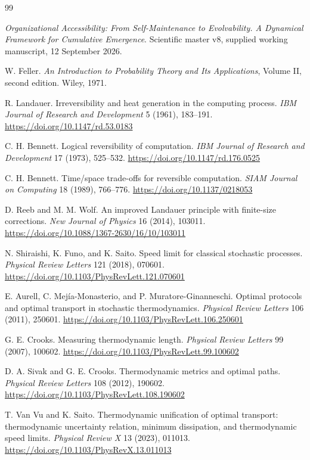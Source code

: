 \documentclass[11pt,a4paper]{article}
\theoremstyle{definition}
\numberwithin{equation}{section}
\begin{document}
\begin{thebibliography}{99}

\emph{Organizational Accessibility: From Self-Maintenance to
Evolvability. A Dynamical Framework for Cumulative Emergence}.
Scientific master v8, supplied working manuscript,
12 September 2026.

W. Feller.
\emph{An Introduction to Probability Theory and Its Applications},
Volume II, second edition.
Wiley, 1971.

R. Landauer.
Irreversibility and heat generation in the computing process.
\emph{IBM Journal of Research and Development}
5 (1961), 183--191.
\url{https://doi.org/10.1147/rd.53.0183}

C. H. Bennett.
Logical reversibility of computation.
\emph{IBM Journal of Research and Development}
17 (1973), 525--532.
\url{https://doi.org/10.1147/rd.176.0525}

C. H. Bennett.
Time/space trade-offs for reversible computation.
\emph{SIAM Journal on Computing}
18 (1989), 766--776.
\url{https://doi.org/10.1137/0218053}

D. Reeb and M. M. Wolf.
An improved Landauer principle with finite-size corrections.
\emph{New Journal of Physics}
16 (2014), 103011.
\url{https://doi.org/10.1088/1367-2630/16/10/103011}

N. Shiraishi, K. Funo, and K. Saito.
Speed limit for classical stochastic processes.
\emph{Physical Review Letters}
121 (2018), 070601.
\url{https://doi.org/10.1103/PhysRevLett.121.070601}

E. Aurell, C. Mej\'ia-Monasterio, and
P. Muratore-Ginanneschi.
Optimal protocols and optimal transport in stochastic thermodynamics.
\emph{Physical Review Letters}
106 (2011), 250601.
\url{https://doi.org/10.1103/PhysRevLett.106.250601}

G. E. Crooks.
Measuring thermodynamic length.
\emph{Physical Review Letters}
99 (2007), 100602.
\url{https://doi.org/10.1103/PhysRevLett.99.100602}

D. A. Sivak and G. E. Crooks.
Thermodynamic metrics and optimal paths.
\emph{Physical Review Letters}
108 (2012), 190602.
\url{https://doi.org/10.1103/PhysRevLett.108.190602}

T. Van Vu and K. Saito.
Thermodynamic unification of optimal transport: thermodynamic uncertainty
relation, minimum dissipation, and thermodynamic speed limits.
\emph{Physical Review X}
13 (2023), 011013.
\url{https://doi.org/10.1103/PhysRevX.13.011013}


\end{thebibliography}
\end{document}
